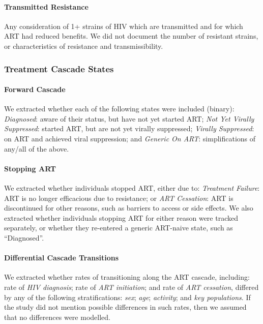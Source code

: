 \paragraph{Transmitted Resistance}
Any consideration of 1+ strains of HIV which are transmitted and for which ART had reduced benefits.
We did not document the number of resistant strains,
or characteristics of resistance and transmissibility.
\subsubsection{Treatment Cascade States}\label{app.sr.defs.art.cascade}
\paragraph{Forward Cascade}
We extracted whether each of the following states were included (binary):
\emph{Diagnosed}: aware of their \hivp status, but have not yet started ART;
\emph{Not Yet Virally Suppressed}: started ART, but are not yet virally suppressed;
\emph{Virally Suppressed}: on ART and achieved viral suppression; and
\emph{Generic On ART}: simplifications of any/all of the above.
\paragraph{Stopping ART}
We extracted whether individuals stopped ART, either due to:
\emph{Treatment Failure}: ART is no longer efficacious due to resistance; or
\emph{ART Cessation}: ART is discontinued for other reasons,
such as barriers to access or side effects.
We also extracted whether individuals stopping ART for either reason
were tracked separately, or whether they re-entered a generic ART-naive state,
such as ``Diagnosed''.
\paragraph{Differential Cascade Transitions}
We extracted whether rates of transitioning along the ART cascade, including:
rate of \emph{HIV diagnosis}; rate of \emph{ART initiation}; and rate of \emph{ART cessation},
differed by any of the following stratifications:
\emph{sex}; \emph{age}; \emph{activity}; and \emph{key populations}.
If the study did not mention possible differences in such rates,
then we assumed that no differences were modelled.
